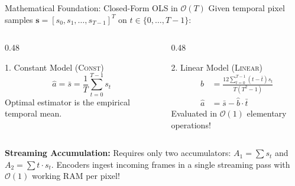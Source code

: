 \documentclass[aspectratio=169, 10pt]{beamer}
\begin{document}
\begin{frame}{Mathematical Foundation: Closed-Form OLS in $\mathcal{O}(T)$}
    Given temporal pixel samples $\mathbf{s} = [s_0, s_1, \dots, s_{T-1}]^T$ on $t \in \{0, \dots, T-1\}$:
    \vspace{1mm}
    \begin{columns}
        \begin{column}{0.48\textwidth}
            \begin{block}{1. Constant Model (\textsc{Const})}
                \begin{equation}
                    \hat{a} = \bar{s} = \frac{1}{T} \sum_{t=0}^{T-1} s_t
                \end{equation}
                Optimal estimator is the empirical temporal mean.
            \end{block}
        \end{column}
        \begin{column}{0.48\textwidth}
            \begin{block}{2. Linear Model (\textsc{Linear})}
                \begin{align}
                    \hat{b} &= \frac{12 \sum_{t=0}^{T-1} (t - \bar{t}) s_t}{T(T^2 - 1)} \\
                    \hat{a} &= \bar{s} - \hat{b} \cdot \bar{t}
                \end{align}
                Evaluated in $\mathcal{O}(1)$ elementary operations!
            \end{block}
        \end{column}
    \end{columns}
    \vspace{2mm}
    \textbf{Streaming Accumulation:} Requires only two accumulators: $A_1 = \sum s_t$ and $A_2 = \sum t \cdot s_t$. Encoders ingest incoming frames in a single streaming pass with $\mathcal{O}(1)$ working RAM per pixel!
\end{frame}
\end{document}
